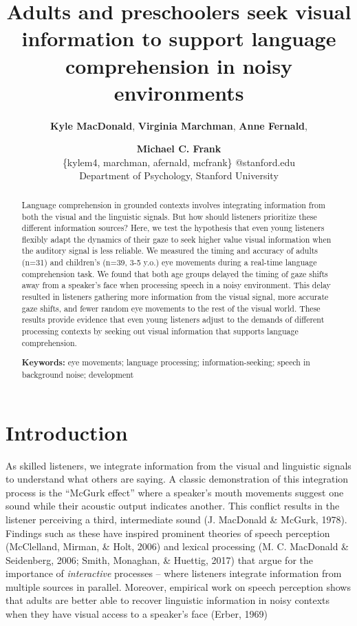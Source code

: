 \documentclass[10pt, letterpaper]{article}
\title{Adults and preschoolers seek visual information to support language
comprehension in noisy environments}
\author{{\large \bf Kyle MacDonald}, {\large \bf Virginia Marchman}, {\large \bf Anne Fernald}, \and {\large \bf Michael C. Frank} \\ \{kylem4, marchman, afernald, mcfrank\} @stanford.edu \\ Department of Psychology, Stanford University}
\begin{document}
\maketitle

\begin{abstract}
Language comprehension in grounded contexts involves integrating
information from both the visual and the linguistic signals. But how
should listeners prioritize these different information sources? Here,
we test the hypothesis that even young listeners flexibly adapt the
dynamics of their gaze to seek higher value visual information when the
auditory signal is less reliable. We measured the timing and accuracy of
adults (n=31) and children's (n=39, 3-5 y.o.) eye movements during a
real-time language comprehension task. We found that both age groups
delayed the timing of gaze shifts away from a speaker's face when
processing speech in a noisy environment. This delay resulted in
listeners gathering more information from the visual signal, more
accurate gaze shifts, and fewer random eye movements to the rest of the
visual world. These results provide evidence that even young listeners
adjust to the demands of different processing contexts by seeking out
visual information that supports language comprehension.

\textbf{Keywords:}
eye movements; language processing; information-seeking; speech in
background noise; development
\end{abstract}

\section{Introduction}\label{introduction}

As skilled listeners, we integrate information from the visual and
linguistic signals to understand what others are saying. A classic
demonstration of this integration process is the ``McGurk effect'' where
a speaker's mouth movements suggest one sound while their acoustic
output indicates another. This conflict results in the listener
perceiving a third, intermediate sound (J. MacDonald \& McGurk, 1978).
Findings such as these have inspired prominent theories of speech
perception (McClelland, Mirman, \& Holt, 2006) and lexical processing
(M. C. MacDonald \& Seidenberg, 2006; Smith, Monaghan, \& Huettig, 2017)
that argue for the importance of \emph{interactive} processes -- where
listeners integrate information from multiple sources in parallel.
Moreover, empirical work on speech perception shows that adults are
better able to recover linguistic information in noisy contexts when
they have visual access to a speaker's face (Erber, 1969)
\end{document}
